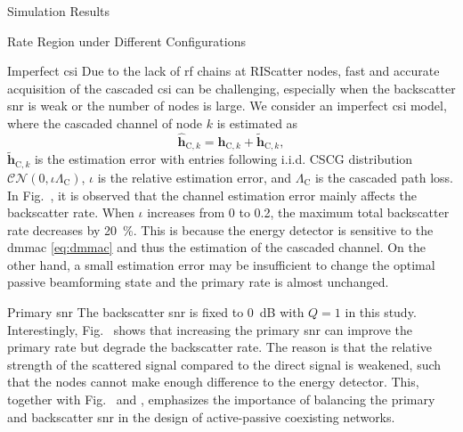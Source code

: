 \documentclass[journal]{IEEEtran}
\begin{document}
\begin{section}{Simulation Results}
\begin{subsection}{Rate Region under Different Configurations}

		\begin{subsubsection}{Imperfect \gls{csi}}
			Due to the lack of \gls{rf} chains at RIScatter nodes, fast and accurate acquisition of the cascaded \gls{csi} can be challenging, especially when the backscatter \gls{snr} is weak or the number of nodes is large.
			We consider an imperfect \gls{csi} model, where the cascaded channel of node $k$ is estimated as
			\begin{equation}
				\hat{\boldsymbol{h}}_{\text{C},k} = \boldsymbol{h}_{\text{C},k} + \tilde{\boldsymbol{h}}_{\text{C},k},
			\end{equation}
			$\tilde{\boldsymbol{h}}_{\text{C},k}$ is the estimation error with entries following i.i.d. CSCG distribution $\mathcal{CN}(0, \iota \Lambda_\text{C})$, $\iota$ is the relative estimation error, and $\Lambda_\text{C}$ is the cascaded path loss.
			In Fig.~, it is observed that the channel estimation error mainly affects the backscatter rate.
			When $\iota$ increases from \num{0} to \num{0.2}, the maximum total backscatter rate decreases by \qty{20}{\percent}.
			This is because the energy detector is sensitive to the \gls{dmmac} \eqref{eq:dmmac} and thus the estimation of the cascaded channel.
			On the other hand, a small estimation error may be insufficient to change the optimal passive beamforming state and the primary rate is almost unchanged.
		\end{subsubsection}

		\begin{subsubsection}{Primary \gls{snr}}
			\label{sc:primary_snr}
			The backscatter \gls{snr} is fixed to \qty{0}{dB} with $Q=1$ in this study.
			Interestingly, Fig.~ shows that increasing the primary \gls{snr} can improve the primary rate but degrade the backscatter rate.
			The reason is that the relative strength of the scattered signal compared to the direct signal is weakened, such that the nodes cannot make enough difference to the energy detector.
			This, together with Fig.~ and , emphasizes the importance of balancing the primary and backscatter \gls{snr} in the design of active-passive coexisting networks.
		\end{subsubsection}


\end{subsection}
\end{section}
\end{document}
